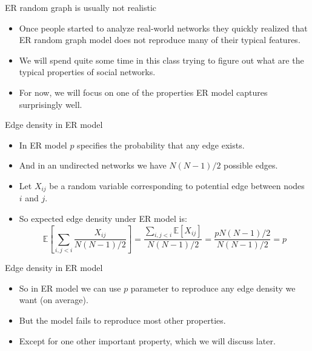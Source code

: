 \documentclass[
    hyperref={colorlinks,linkcolor=blue,urlcolor=blue,citecolor=blue}
]{beamer}
\newcommand{\E}{\ensuremath{\mathbb{E}}}
\begin{document}
\begin{frame}{ER random graph is usually not realistic}
\begin{itemize}
    \item<1-> Once people started to analyze real-world networks they quickly
    realized that ER random graph model does not reproduce many of their
    typical features.
    \item<2-> We will spend quite some time in this class trying to figure
    out what are the typical properties of social networks.
    \item<3-> For now, we will focus on one of the properties ER model captures
    surprisingly well.
\end{itemize}
\end{frame}

\begin{frame}{Edge density in ER model}
\begin{itemize}
    \item<2-> In ER model $p$ specifies the probability that any edge exists.
    \item<3-> And in an undirected networks we have $N(N-1)/2$ possible
    edges.
    \item<4-> Let $X_{ij}$ be a random variable corresponding to potential
    edge between nodes $i$ and $j$.
    \item<5-> So expected edge density under ER model is:
    \[
        \E\left[
            \sum_{i, j < i}\frac{X_{ij}}{N(N-1)/2}
        \right]
        =
        \frac{\sum_{i, j<i}\E[X_{ij}]}{N(N-1)/2}
        =
        \frac{pN(N-1)/2}{N(N-1)/2}
        =
        p
    \]
\end{itemize}
\end{frame}

\begin{frame}{Edge density in ER model}
\begin{itemize}
    \item<2-> So in ER model we can use $p$ parameter to reproduce any edge
    density we want (on average).
    \item<3-> But the model fails to reproduce most other properties.
    \item<4-> Except for one other important property, which we will discuss later.
\end{itemize}
\end{frame}
\end{document}
